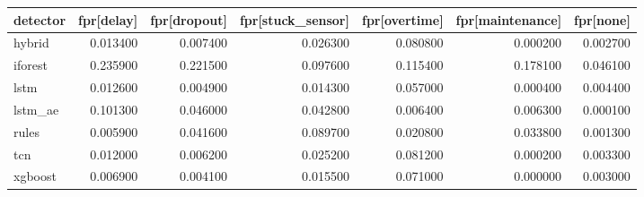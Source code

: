 \begin{tabular}{lrrrrrr}
\toprule
detector & fpr[delay] & fpr[dropout] & fpr[stuck\_sensor] & fpr[overtime] & fpr[maintenance] & fpr[none] \\
\midrule
hybrid & 0.013400 & 0.007400 & 0.026300 & 0.080800 & 0.000200 & 0.002700 \\
iforest & 0.235900 & 0.221500 & 0.097600 & 0.115400 & 0.178100 & 0.046100 \\
lstm & 0.012600 & 0.004900 & 0.014300 & 0.057000 & 0.000400 & 0.004400 \\
lstm\_ae & 0.101300 & 0.046000 & 0.042800 & 0.006400 & 0.006300 & 0.000100 \\
rules & 0.005900 & 0.041600 & 0.089700 & 0.020800 & 0.033800 & 0.001300 \\
tcn & 0.012000 & 0.006200 & 0.025200 & 0.081200 & 0.000200 & 0.003300 \\
xgboost & 0.006900 & 0.004100 & 0.015500 & 0.071000 & 0.000000 & 0.003000 \\
\bottomrule
\end{tabular}
